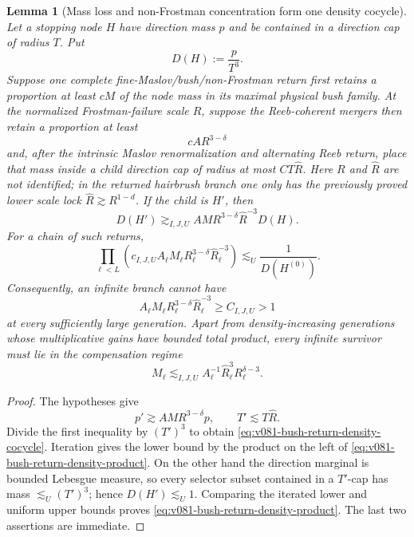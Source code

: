 \documentclass[10pt]{article}
\newtheorem{lemma}[theorem]{Lemma}
\begin{document}
\begin{lemma}[Mass loss and non-Frostman concentration form one density cocycle]
\label{lem:v081-bush-return-density-cocycle}
Let a stopping node \(H\) have direction mass \(p\) and be contained in a direction cap of radius
\(T\).  Put
\[
D(H):=\frac{p}{T^3}.
\]
Suppose one complete fine-Maslov/bush/non-Frostman return first retains a proportion at least
\(cM\) of the node mass in its maximal physical bush family.  At the normalized Frostman-failure
scale \(R\), suppose the Reeb-coherent mergers then retain a proportion at least
\[
cA R^{3-\delta}
\]
and, after the intrinsic Maslov renormalization and alternating Reeb return, place that mass inside
a child direction cap of radius at most \(CT\widehat R\).  Here \(R\) and \(\widehat R\) are not
identified; in the returned hairbrush branch one only has the previously proved lower scale lock
\(\widehat R\gtrsim R^{1-d}\).  If the child is \(H'\), then
\begin{equation}
\label{eq:v081-bush-return-density-cocycle}
\boxed{
D(H')
\gtrsim_{I,J,U}
A M R^{3-\delta}\widehat R^{-3}D(H).
}
\end{equation}
For a chain of such returns,
\begin{equation}
\label{eq:v081-bush-return-density-product}
\boxed{
\prod_{\ell<L}
\left(c_{I,J,U}A_\ell M_\ell
R_\ell^{3-\delta}\widehat R_\ell^{-3}\right)
\lesssim_U
\frac1{D(H^{(0)})}.
}
\end{equation}
Consequently, an infinite branch cannot have
\[
A_\ell M_\ell
R_\ell^{3-\delta}\widehat R_\ell^{-3}
\ge C_{I,J,U}>1
\]
at every sufficiently large generation.  Apart from density-increasing generations whose
multiplicative gains have bounded total product, every infinite survivor must lie in the
compensation regime
\begin{equation}
\label{eq:v081-bush-return-compensation-regime}
\boxed{
M_\ell
\lesssim_{I,J,U}
A_\ell^{-1}\widehat R_\ell^3R_\ell^{\delta-3}.
}
\end{equation}
\end{lemma}

\begin{proof}
The hypotheses give
\[
p'
\gtrsim
A M R^{3-\delta}p,
\qquad
T'\lesssim T\widehat R.
\]
Divide the first inequality by \((T')^3\) to obtain
\eqref{eq:v081-bush-return-density-cocycle}.  Iteration gives the lower bound by the product on the
left of \eqref{eq:v081-bush-return-density-product}.  On the other hand the direction marginal is
bounded Lebesgue measure, so every selector subset contained in a \(T'\)-cap has mass
\(\lesssim_U(T')^3\); hence \(D(H')\lesssim_U1\).  Comparing the iterated lower and uniform upper
bounds proves \eqref{eq:v081-bush-return-density-product}.  The last two assertions are immediate.
\end{proof}
\end{document}
